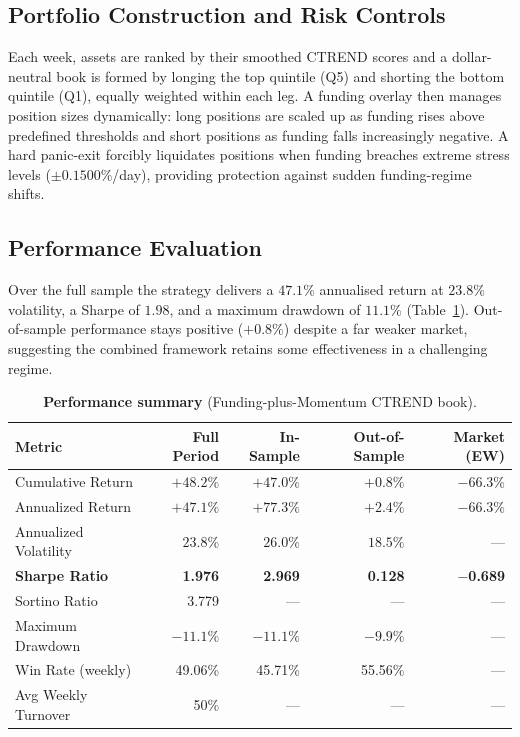 \documentclass[10pt,twocolumn,a4paper]{article}
\begin{document}
\subsection{Portfolio Construction and Risk Controls}

Each week, assets are ranked by their smoothed CTREND scores and a
dollar-neutral book is formed by longing the top quintile (Q5) and
shorting the bottom quintile (Q1), equally weighted within each leg.  A
funding overlay then manages position sizes dynamically: long positions
are scaled up as funding rises above predefined thresholds and short
positions as funding falls increasingly negative.  A hard panic-exit
forcibly liquidates positions when funding breaches extreme stress levels
($\pm 0.1500\%$/day), providing protection against sudden funding-regime
shifts.

\subsection{Performance Evaluation}

Over the full sample the strategy delivers a $47.1\%$ annualised return at
$23.8\%$ volatility, a Sharpe of $1.98$, and a maximum drawdown of $11.1\%$
(Table~\ref{tab:fm-perf}).  Out-of-sample performance stays positive
($+0.8\%$) despite a far weaker market, suggesting the combined framework
retains some effectiveness in a challenging regime.

\begin{table}[t!]
  \centering
  \caption{\textbf{Performance summary} (Funding-plus-Momentum CTREND book).}
  \label{tab:fm-perf}
  \begin{tabular}{lrrrr}
    \toprule
    \textbf{Metric} & \textbf{Full Period} & \textbf{In-Sample}
      & \textbf{Out-of-Sample} & \textbf{Market (EW)} \\
    \midrule
    Cumulative Return     & $+48.2\%$ & $+47.0\%$ & $+0.8\%$  & $-66.3\%$ \\
    Annualized Return     & $+47.1\%$ & $+77.3\%$ & $+2.4\%$  & $-66.3\%$ \\
    Annualized Volatility & $23.8\%$  & $26.0\%$  & $18.5\%$  & --- \\
    \textbf{Sharpe Ratio} & \textbf{1.976} & \textbf{2.969} & \textbf{0.128} & \textbf{$-$0.689} \\
    Sortino Ratio         & 3.779     & ---       & ---       & --- \\
    Maximum Drawdown      & $-11.1\%$ & $-11.1\%$ & $-9.9\%$  & --- \\
    Win Rate (weekly)     & 49.06\%   & 45.71\%   & 55.56\%   & --- \\
    Avg Weekly Turnover   & 50\%      & ---       & ---       & --- \\
    \bottomrule
  \end{tabular}
\end{table}
\end{document}
